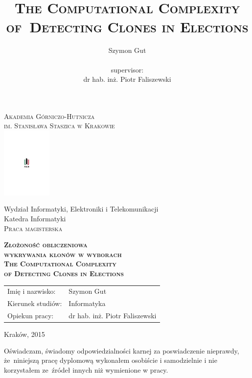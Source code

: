 \documentclass[a4paper,12pt]{report}
\author{Szymon Gut\\\newline\\supervisor:\\dr hab. inż. Piotr Faliszewski}
\title{\textsc{The Computational Complexity of~Detecting Clones in Elections}}
\date{}
\theoremstyle{plain}
\theoremstyle{definition}
\theoremstyle{remark}
\begin{document}
\begin{titlepage}
\begin{center}
\textsc{\Large Akademia Górniczo-Hutnicza \\ im. Stanisława Staszica w Krakowie}\\[0.2cm]

\includegraphics[width=70pt,viewport=250 350 350 500]{agh-logo.pdf}

{\Large Wydział Informatyki, Elektroniki i Telekomunikacji}\\[0.4cm]
{\Large Katedra Informatyki}\\[1.5cm]

\textsc{{\huge Praca magisterska}}\\[1.0cm]

\begin{spacing}{2}
\textbf{\textsc{\Large Złożoność obliczeniowa\\wykrywania klonów w wyborach}}\\[0.1cm]
\textbf{\textsc{\Large The Computational Complexity\\of Detecting Clones in Elections}}\\[2cm]
\end{spacing}

\end{center}

\vfill
\begin{flushleft}
\begin{tabular}{p{45mm}l}
\large Imię i nazwisko: & {\large Szymon Gut}\\[-1mm]
\large Kierunek studiów: & {\large Informatyka}\\[-1mm]
\large Opiekun pracy: & {\large dr hab. inż. Piotr Faliszewski}\\[2.0cm]
\end{tabular}
\end{flushleft}

\begin{center}
Kraków, 2015
\end{center}

\clearpage
\thispagestyle{empty}

\sloppy
Oświadczam, świadomy odpowiedzialności karnej za poswiadczenie nieprawdy,
że~niniejszą pracę dyplomową wykonałem osobiście i samodzielnie i nie korzystałem
ze~źródeł innych niż wymienione w pracy.


\end{titlepage}
\end{document}
